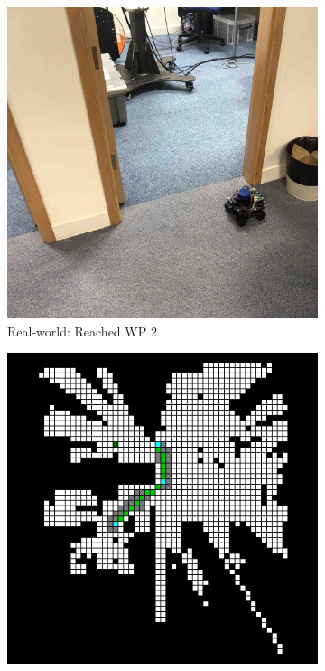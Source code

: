 \begin{figure}[htb]\ContinuedFloat
  \begin{subfigure}[b]{0.32\linewidth}
    \includegraphics[width=\linewidth]{images/real/robo/4.JPG}
     \caption{Real-world: Reached WP 2}
  \end{subfigure}
  \hfill
  \begin{subfigure}[b]{0.32\linewidth}
    \includegraphics[width=\linewidth]{images/real/sys/4_2.png}

\end{subfigure}
\end{figure}
